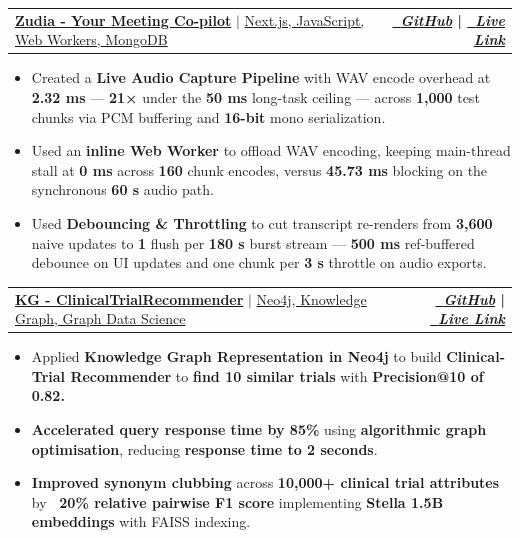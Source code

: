 \documentclass[letterpaper,9pt]{article}
\makeatletter
\newcommand{\resumeItem}[1]{
  \item\small{
    {#1 \vspace{-2pt}}
  }
}
\newcommand{\resumeProjectHeading}[2]{
    \item
    \begin{tabular*}{1.001\textwidth}{l@{\extracolsep{\fill}}r}
      \small#1 & \textbf{\small #2}\\
    \end{tabular*}\vspace{-7pt}
}
\newcommand{\resumeItemListStart}{\begin{itemize}}
\newcommand{\resumeItemListEnd}{\end{itemize}\vspace{-5pt}}
\makeatother
\begin{document}
\resumeProjectHeading
{{\textbf{\large{\underline{Zudia - Your Meeting Co-pilot}}} } $|$ \large{\underline{Next.js, JavaScript, Web Workers, MongoDB}}}{\href{https://github.com/PriyamJChakrabarty/Zudia--Your-Meeting-Co-Pilot}{\raisebox{-0.1\height}\faGithub\ \textit{GitHub}} | \href{https://www.placeholder.com}{\raisebox{-0.1\height}\faExternalLink\ \textit{Live Link}}}
\resumeItemListStart
\resumeItem{\normalsize{Created a \textbf{Live Audio Capture Pipeline} with WAV encode overhead at \textbf{2.32 ms} — \textbf{21×} under the \textbf{50 ms} long-task ceiling — across \textbf{1,000} test chunks via PCM buffering and \textbf{16-bit} mono serialization.}}
\resumeItem{\normalsize{Used an \textbf{inline Web Worker} to offload WAV encoding, keeping main-thread stall at \textbf{0 ms} across \textbf{160} chunk encodes, versus \textbf{45.73 ms} blocking on the synchronous \textbf{60 s} audio path.}}
\resumeItem{\normalsize{Used \textbf{Debouncing \& Throttling} to cut transcript re-renders from \textbf{3,600} naive updates to \textbf{1} flush per \textbf{180 s} burst stream — \textbf{500 ms} ref-buffered debounce on UI updates and one chunk per \textbf{3 s} throttle on audio exports.}}
\resumeItemListEnd









\resumeProjectHeading
{{\textbf{\large{\underline{KG - ClinicalTrialRecommender}}} } $|$ \large{\underline{Neo4j, Knowledge Graph, Graph Data Science}}}{\href{https://github.com/PriyamJChakrabarty/KG-ClinicalTrialRecommendor}{\raisebox{-0.1\height}\faGithub\ \textit{GitHub}} | \href{https://priyamjchakrabarty.github.io/KG-ClinicalGraph-Web/}{\raisebox{-0.1\height}\faExternalLink\ \textit{Live Link}}}
\resumeItemListStart
\resumeItem{\normalsize{Applied \textbf{Knowledge Graph Representation in Neo4j} to build \textbf{Clinical-Trial Recommender} to \textbf{find 10 similar trials} with \textbf{Precision@10 of 0.82.}}}
\resumeItem{\normalsize{\textbf{Accelerated query response time by 85\%} using \textbf{algorithmic graph optimisation}, reducing\textbf{ response time to 2 seconds}.}}
\resumeItem{\normalsize{\textbf{Improved synonym clubbing} across \textbf{10,000+ clinical trial attributes} by \textbf{~20\% relative pairwise F1 score} implementing \textbf{Stella 1.5B embeddings} with FAISS indexing.}}
\resumeItemListEnd
\end{document}
